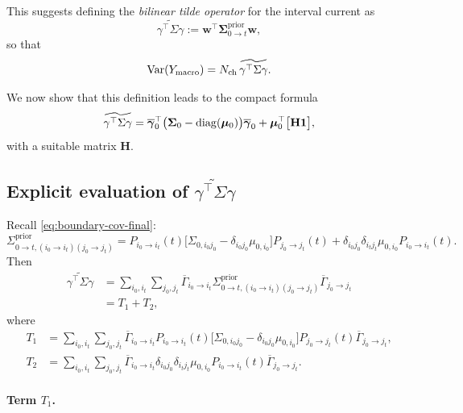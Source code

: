 \documentclass[11pt]{article}
\begin{document}
This suggests defining the \emph{bilinear tilde operator} for the interval
current as
\[
  \widetilde{\gamma^\top\Sigma\gamma}
  :=
  \mathbf{w}^\top
  \boldsymbol{\Sigma}^{\text{prior}}_{0\to t}
  \mathbf{w},
\]
so that
\[
  \operatorname{Var}(Y_{\text{macro}})
  =
  N_{\text{ch}}\,
  \widetilde{\gamma^\top\Sigma\gamma}.
\]

We now show that this definition leads to the compact formula
\[
  \widetilde{\gamma^\top\Sigma\gamma}
  =
  \overline{\boldsymbol{\gamma}}_0^\top
  \bigl(\boldsymbol{\Sigma}_0-\operatorname{diag}(\boldsymbol{\mu}_0)\bigr)
  \overline{\boldsymbol{\gamma}}_0
  +
  \boldsymbol{\mu}_0^\top
  \bigl[\mathbf{H}\mathbf{1}\bigr],
\]
with a suitable matrix \(\mathbf{H}\).

\subsection{Explicit evaluation of
\texorpdfstring{$\widetilde{\gamma^\top\Sigma\gamma}$}{tilde(gammaTSigmagamma)}}

Recall
\eqref{eq:boundary-cov-final}:
\[
  \Sigma^{\text{prior}}_{0\to t,(i_0\to i_t)(j_0\to j_t)}
  =
  P_{i_0\to i_t}(t)
  \bigl[
    \Sigma_{0,i_0 j_0}
    - \delta_{i_0 j_0}\mu_{0,i_0}
  \bigr]
  P_{j_0\to j_t}(t)
  +
  \delta_{i_0 j_0}\delta_{i_t j_t}
  \mu_{0,i_0}P_{i_0\to i_t}(t).
\]
Then
\begin{align}
  \widetilde{\gamma^\top\Sigma\gamma}
  &=
  \sum_{i_0,i_t}
  \sum_{j_0,j_t}
  \overline{\Gamma}_{i_0\to i_t}
  \Sigma^{\text{prior}}_{0\to t,(i_0\to i_t)(j_0\to j_t)}
  \overline{\Gamma}_{j_0\to j_t}
  \nonumber\\
  &=
  T_1 + T_2,
  \label{eq:tilde-split}
\end{align}
where
\begin{align*}
  T_1
  &=
  \sum_{i_0,i_t}
  \sum_{j_0,j_t}
  \overline{\Gamma}_{i_0\to i_t}
  P_{i_0\to i_t}(t)
  \bigl[
    \Sigma_{0,i_0 j_0}
    - \delta_{i_0 j_0}\mu_{0,i_0}
  \bigr]
  P_{j_0\to j_t}(t)
  \overline{\Gamma}_{j_0\to j_t},
  \\
  T_2
  &=
  \sum_{i_0,i_t}
  \sum_{j_0,j_t}
  \overline{\Gamma}_{i_0\to i_t}
  \delta_{i_0 j_0}\delta_{i_t j_t}
  \mu_{0,i_0}P_{i_0\to i_t}(t)
  \overline{\Gamma}_{j_0\to j_t}.
\end{align*}

\paragraph{Term \(T_1\).}
\end{document}
